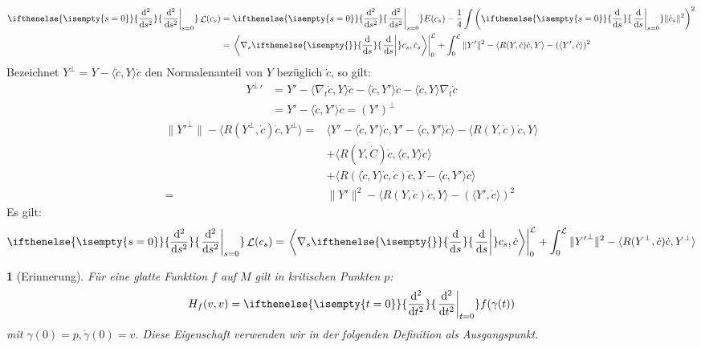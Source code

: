 \documentclass[paper=A4, twoside, chapterprefix=true, bibliography=totoc, headsepline]{scrbook}
\DeclareMathOperator{\calL}{\mathcal{L}}
\newcommand{\dop}{\mathrm{d}}
\newcommand{\difffrac}[3][]{\ifthenelse{\isempty{#1}}{\frac{\dop #2}{\dop #3}}{\left. \frac{\dop #2}{\dop #3} \right|_{#1}}}
\theoremstyle{plain}
\theoremstyle{nonumberplain}
\theoremstyle{empty}
\newtheorem{emptythm}{}%
\theoremstyle{break}
\begin{document}
\begin{align*}
  \difffrac[s=0]{^2}{s^2} \calL(c_s) &= \difffrac[s=0]{^2}{s^2} E(c_s) - \frac{1}{4} \int \left( \difffrac[s=0]{}{s} \| \dot c_s \|^2 \right)^2 \\
  &= \left.\left\langle \nabla_s \difffrac{}{s} c_s, \dot c_s
    \right\rangle\right|_{0}^{\calL} + \int_0^{\calL} \| Y' \|^2 -
  \langle R(Y, \dot c) \dot c, Y \rangle - ( \langle Y', \dot c
  \rangle )^2
\end{align*}
Bezeichnet $Y^\perp = Y - \langle \dot c, Y \rangle \dot c$ den
Normalenanteil von $Y$ bez\"uglich $\dot c$, so gilt:
\begin{align*}
  {Y^\perp}' &= Y' - \langle \nabla_t \dot c, Y \rangle \dot c - \langle \dot c, Y' \rangle \dot c - \langle \dot c, Y \rangle \nabla_t \dot c \\
  &= Y' - \langle \dot c, Y' \rangle \dot c = (Y')^\perp
\end{align*}
\begin{align*}
  \| {Y'}^\perp \| - \langle R(Y^\perp, \dot c) \dot c, Y^\perp \rangle ={}& \langle Y' - \langle \dot c, Y' \rangle \dot c, Y' - \langle \dot c, Y' \rangle \dot c \rangle - \langle R(Y, \dot c) \dot c, Y \rangle \\
  & + \langle R(Y, \dot C) \dot c, \langle \dot c, Y \rangle \dot c \rangle \\
  & + \langle R ( \langle \dot c, Y \rangle \dot c, \dot c) \dot c, Y - \langle \dot c, Y' \rangle \dot c \rangle \\
  ={}& \| Y' \|^2 - \langle R(Y, \dot c) \dot c, Y \rangle - ( \langle
  Y', \dot c \rangle )^2
\end{align*}
Es gilt:
\begin{align*}
  \difffrac[s=0]{^2}{s^2} \calL(c_s) = \left.\left\langle \nabla_s
      \difffrac{}{s} c_s, \dot c \right\rangle\right|_{0}^{\calL} +
  \int_0^{\calL} \| {Y'}^\perp \|^2 - \langle R(Y^\perp, \dot c) \dot
  c, Y^\perp \rangle
\end{align*}


\begin{emptythm}[Erinnerung]
  F\"ur eine glatte Funktion $f$ auf $M$ gilt in kritischen Punkten $p$:
  \begin{align*}
    H_f(v,v) = \difffrac[t=0]{^2}{t^2}f(\gamma(t))
  \end{align*}
  mit $\gamma(0) = p, \dot\gamma(0) = v$.
  Diese Eigenschaft verwenden wir in der folgenden Definition als Ausgangspunkt.
\end{emptythm}
\end{document}
